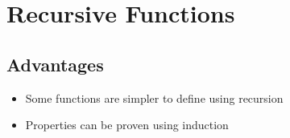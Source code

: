 
\section{Recursive Functions}
\subsection{Advantages}
\begin{itemize}
    \item Some functions are simpler to define using recursion
    \item Properties can be proven using induction
\end{itemize}